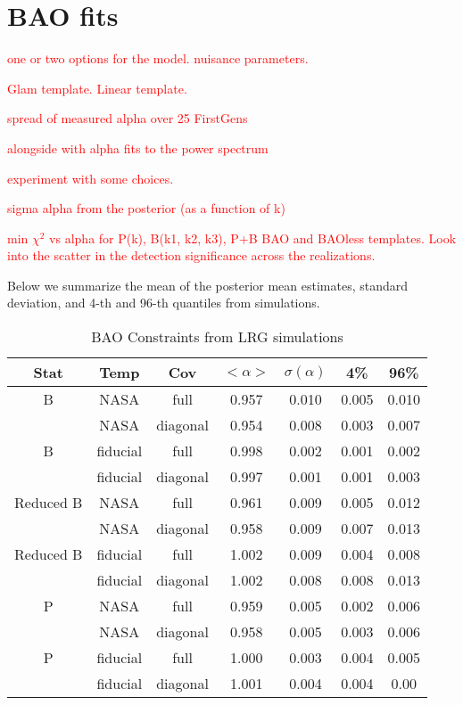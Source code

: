 \section{BAO fits}
\label{sec:fits}

\textcolor{red}{one or two options for the model. nuisance parameters.}

\textcolor{red}{Glam template. Linear template.}

\textcolor{red}{spread of measured alpha over 25 FirstGens}

\textcolor{red}{alongside with alpha fits to the power spectrum}

\textcolor{red}{experiment with some choices.}

\textcolor{red}{sigma alpha from the posterior (as a function of k)}

\textcolor{red}{min $\chi^{2}$ vs alpha for P(k), B(k1, k2, k3), P+B BAO and BAOless templates. Look into the scatter in the detection significance across the realizations.}




Below we summarize the mean of the posterior mean estimates, standard deviation, and 4-th and 96-th quantiles from simulations. 

\begin{table}
\caption{‌BAO Constraints from LRG simulations}
\begin{center}
\begin{tabular}{ccccccc}
Stat & Temp & Cov &$< \alpha >$ & $\sigma(\alpha) $ & 4\%&96\%\\
\hline
                            B  &       NASA & full & 0.957 & 0.010& 0.005 & 0.010\\ 
 &       NASA & diagonal & 0.954 & 0.008 &0.003 &0.007\\ 
\hline
                            B  &   fiducial & full & 0.998 & 0.002& 0.001 & 0.002\\ 
 &   fiducial & diagonal & 0.997 & 0.001 &0.001 &0.003\\ 
\hline
                    Reduced B  &       NASA & full & 0.961 & 0.009& 0.005 & 0.012\\ 
 &       NASA & diagonal & 0.958 & 0.009 &0.007 &0.013\\ 
\hline
                    Reduced B  &   fiducial & full & 1.002 & 0.009& 0.004 & 0.008\\ 
 &   fiducial & diagonal & 1.002 & 0.008 &0.008 &0.013\\ 
\hline
                            P  &       NASA & full & 0.959 & 0.005& 0.002 & 0.006\\ 
 &       NASA & diagonal & 0.958 & 0.005 &0.003 &0.006\\ 
\hline
                            P  &   fiducial & full & 1.000 & 0.003& 0.004 & 0.005\\ 
 &   fiducial & diagonal & 1.001 & 0.004 &0.004 &0.00
\end{tabular}
\end{center}
\label{tab:lrg}
\end{table}


